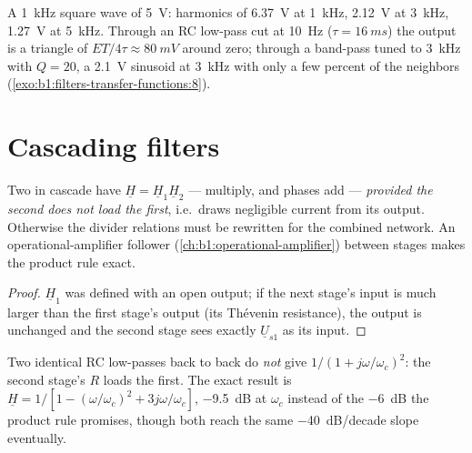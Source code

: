 \begin{example}[Numbers]\label{ex:b1:filters-transfer-functions:numbers}
A \qty{1}{kHz} square wave of  \qty{5}{V}: harmonics of
\qty{6.37}{V} at \qty{1}{kHz}, \qty{2.12}{V} at \qty{3}{kHz},
\qty{1.27}{V} at \qty{5}{kHz}. Through an RC low-pass cut at
\qty{10}{Hz} ($\tau = \qty{16}{ms}$) the output is a triangle of
 $ET/4\tau \approx \qty{80}{mV}$ around zero; through a
band-pass tuned to \qty{3}{kHz} with $Q = 20$, a \qty{2.1}{V} sinusoid
at \qty{3}{kHz} with only a few percent of the neighbors
(\cref{exo:b1:filters-transfer-functions:8}).
\end{example}

\section{Cascading filters}

\begin{proposition}\label{prop:b1:filters-transfer-functions:cascade}
Two  in cascade have $\underline H = \underline H_1\underline H_2$
---  multiply,  and phases add --- \emph{provided the second
does not load the first}, i.e.\ draws negligible current from its
output. Otherwise the divider relations must be rewritten for the
combined network. An operational-amplifier follower
(\cref{ch:b1:operational-amplifier}) between stages makes the product
rule exact.
\end{proposition}

\begin{proof}
$\underline H_1$ was defined with an open output; if the next stage's
input  is much larger than the first stage's output 
(its Thévenin resistance), the output  is unchanged and the
second stage sees exactly $\underline U_{s1}$ as its input.
\end{proof}

\begin{example}\label{ex:b1:filters-transfer-functions:tworc}
Two identical RC low-passes back to back do \emph{not} give
$1/(1 + j\omega/\omega_c)^2$: the second stage's $R$ loads the first.
The exact result is $\underline H = 1/[1 - (\omega/\omega_c)^2 +
3j\omega/\omega_c]$, \qty{-9.5}{dB} at $\omega_c$ instead of the
\qty{-6}{dB} the product rule promises, though both reach the same
\qty{-40}{dB/decade} slope eventually.
\end{example}

